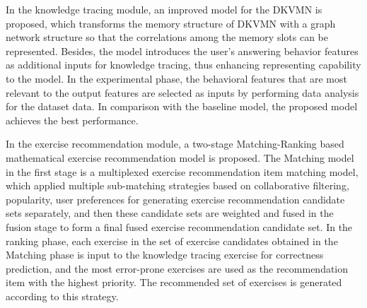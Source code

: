 In the knowledge tracing module, an improved model for the DKVMN is proposed, which transforms the memory structure of DKVMN with a graph network structure so that the correlations among the memory slots can be represented. Besides, the model introduces the user's answering behavior features as additional inputs for knowledge tracing, thus enhancing representing capability to the model. In the experimental phase, the behavioral features that are most relevant to the output features are selected as inputs by performing data analysis for the dataset data. In comparison with the baseline model, the proposed model achieves the best performance.



In the exercise recommendation module, a two-stage Matching-Ranking based mathematical exercise recommendation model is proposed. The Matching model in the first stage is a multiplexed exercise recommendation item matching model, which applied multiple sub-matching strategies based on collaborative filtering, popularity, user preferences for generating exercise recommendation candidate sets separately, and then these candidate sets are weighted and fused in the fusion stage to form a final fused exercise recommendation candidate set. In the ranking phase, each exercise in the set of exercise candidates obtained in the Matching phase is input to the knowledge tracing exercise for correctness prediction, and the most error-prone exercises are used as the recommendation item with the highest priority. The recommended set of exercises is generated according to this strategy.


